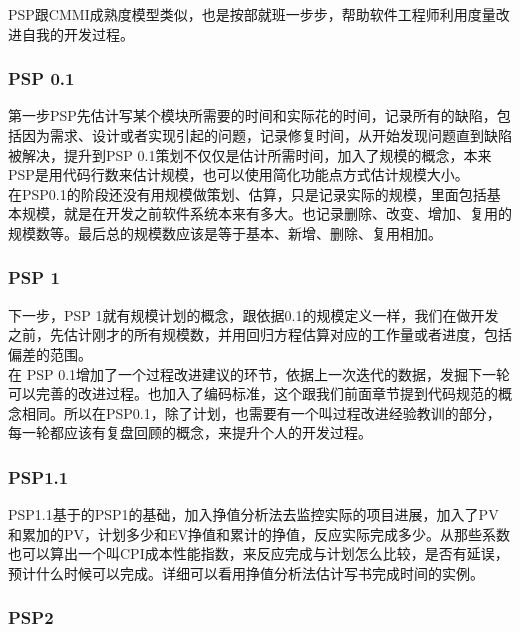 PSP跟CMMI成熟度模型类似，也是按部就班一步步，帮助软件工程师利用度量改进自我的开发过程。

\hypertarget{psp-0.1}{%
\subsubsection{PSP 0.1}\label{psp-0.1}}

第一步PSP先估计写某个模块所需要的时间和实际花的时间，记录所有的缺陷，包括因为需求、设计或者实现引起的问题，记录修复时间，从开始发现问题直到缺陷被解决，提升到PSP 0.1策划不仅仅是估计所需时间，加入了规模的概念，本来PSP是用代码行数来估计规模，也可以使用简化功能点方式估计规模大小。\\
在PSP0.1的阶段还没有用规模做策划、估算，只是记录实际的规模，里面包括基本规模，就是在开发之前软件系统本来有多大。也记录删除、改变、增加、复用的规模数等。最后总的规模数应该是等于基本、新增、删除、复用相加。

\hypertarget{psp1}{%
\subsubsection{PSP 1}\label{psp1}}

下一步，PSP 1就有规模计划的概念，跟依据0.1的规模定义一样，我们在做开发之前，先估计刚才的所有规模数，并用回归方程估算对应的工作量或者进度，包括偏差的范围。\\
在
PSP 0.1增加了一个过程改进建议的环节，依据上一次迭代的数据，发掘下一轮可以完善的改进过程。也加入了编码标准，这个跟我们前面章节提到代码规范的概念相同。所以在PSP0.1，除了计划，也需要有一个叫过程改进经验教训的部分，每一轮都应该有复盘回顾的概念，来提升个人的开发过程。

\hypertarget{psp1.1}{%
\subsubsection{PSP1.1}\label{psp1.1}}

PSP1.1基于的PSP1的基础，加入挣值分析法去监控实际的项目进展，加入了PV和累加的PV，计划多少和EV挣值和累计的挣值，反应实际完成多少。从那些系数也可以算出一个叫CPI成本性能指数，来反应完成与计划怎么比较，是否有延误，预计什么时候可以完成。详细可以看用挣值分析法估计写书完成时间的实例。

\hypertarget{psp2}{%
\subsubsection{PSP2}\label{psp2}}

